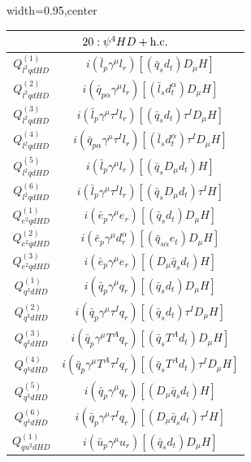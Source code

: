 \begin{table}[H]
\begin{center}
\begin{adjustbox}{width=0.95\textwidth,center}
\small
\begin{minipage}[t]{6.1cm}
\renewcommand{\arraystretch}{1.5}
\begin{tabular}[t]{c|c}
\multicolumn{2}{c}{\boldmath$20:\psi^4HD + \mathrm{h.c.}$} \\
\hline
$Q_{l^2qdHD}^{(1)}$  &  $i (\bar l_p \gamma^\mu l_r) [(\bar q_s d_t) D_\mu H]$ \\
%
$Q_{l^2qdHD}^{(2)}$  &  $i (\bar q_{p\alpha} \gamma^\mu l_r) [(\bar l_s d_t^\alpha) D_\mu H]$ \\
%
$Q_{l^2qdHD}^{(3)}$  &  $i (\bar l_p \gamma^\mu \tau^I l_r) [(\bar q_s d_t) \tau^I D_\mu H]$ \\
%
$Q_{l^2qdHD}^{(4)}$  &  $i (\bar q_{p\alpha} \gamma^\mu \tau^I l_r) [(\bar l_s d_t^\alpha) \tau^I D_\mu H]$ \\
%
$Q_{l^2qdHD}^{(5)}$  &  $i (\bar l_p \gamma^\mu l_r) [(\bar q_s D_\mu d_t) H]$ \\
%
$Q_{l^2qdHD}^{(6)}$  &  $i (\bar l_p \gamma^\mu \tau^I l_r) [(\bar q_s D_\mu d_t) \tau^I H]$ \\
%
$Q_{e^2qdHD}^{(1)}$  &  $i (\bar e_p \gamma^\mu e_r) [(\bar q_s d_t) D_\mu H]$ \\
%
$Q_{e^2qdHD}^{(2)}$  &  $i (\bar e_p \gamma^\mu d_r^\alpha) [(\bar q_{s\alpha} e_t) D_\mu H]$ \\
%
$Q_{e^2qdHD}^{(3)}$  &  $i (\bar e_p \gamma^\mu e_r) [(D_\mu \bar q_s d_t) H]$ \\
%
$Q_{q^3dHD}^{(1)}$  &  $i (\bar q_p \gamma^\mu q_r) [(\bar q_s d_t) D_\mu H]$ \\
%
$Q_{q^3dHD}^{(2)}$  &  $i (\bar q_p \gamma^\mu \tau^I q_r) [(\bar q_s d_t) \tau^I D_\mu H]$ \\
%
$Q_{q^3dHD}^{(3)}$  &  $i (\bar q_p \gamma^\mu T^A q_r) [(\bar q_s T^A d_t) D_\mu H]$ \\
%
$Q_{q^3dHD}^{(4)}$  &  $i (\bar q_p \gamma^\mu T^A \tau^I q_r) [(\bar q_s T^A d_t) \tau^I D_\mu H]$ \\
%
$Q_{q^3dHD}^{(5)}$  &  $i (\bar q_p \gamma^\mu q_r) [(D_\mu \bar q_s d_t) H]$ \\
%
$Q_{q^3dHD}^{(6)}$  &  $i (\bar q_p \gamma^\mu \tau^I q_r) [(D_\mu \bar q_s d_t) \tau^I H]$ \\
%
$Q_{qu^2dHD}^{(1)}$  &  $i (\bar u_p \gamma^\mu u_r) [(\bar q_s d_t) D_\mu H]$ \\

\end{tabular}
\end{minipage}
\end{adjustbox}
\end{center}
\end{table}
